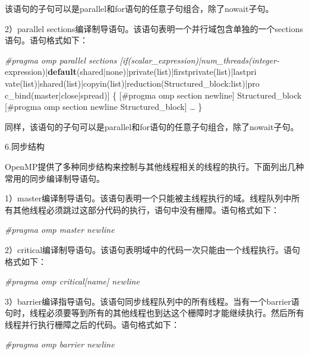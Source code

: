 \documentclass[]{ctexbook}
\newenvironment{Shaded}{\begin{snugshade}}{\end{snugshade}}
\newcommand{\ControlFlowTok}[1]{\textcolor[rgb]{0.13,0.29,0.53}{\textbf{#1}}}
\newcommand{\NormalTok}[1]{#1}
\newcommand{\PreprocessorTok}[1]{\textcolor[rgb]{0.56,0.35,0.01}{\textit{#1}}}
\begin{document}
该语句的子句可以是parallel和for语句的任意子句组合，除了nowait子句。

2）parallel sections编译制导语句。该语句表明一个并行域包含单独的一个sections语句。语句格式如下：

\begin{Shaded}
\begin{Highlighting}[]
\PreprocessorTok{\#pragma omp parallel sections [if(scalar\_expression)|num\_threads(integer{-}}
\NormalTok{expression)|}\ControlFlowTok{default}\NormalTok{(shared|none)|private(list)|firstprivate(list)|lastpri}
\NormalTok{vate(list)|shared(list)|copyin(list)|reduction(Structured\_block:list)|pro}
\NormalTok{c\_bind(master|close|spread)]}
\NormalTok{\{}
\NormalTok{    [\#progma omp section newline]}
\NormalTok{    Structured\_block}
\NormalTok{    [\#progma omp section newline}
\NormalTok{    Structured\_block]}
\NormalTok{    …}
\NormalTok{\}}
\end{Highlighting}
\end{Shaded}

同样，该语句的子句可以是parallel和for语句的任意子句组合，除了nowait子句。

6.同步结构

OpenMP提供了多种同步结构来控制与其他线程相关的线程的执行。下面列出几种常用的同步编译制导语句。

1）master编译制导语句。该语句表明一个只能被主线程执行的域。线程队列中所有其他线程必须跳过这部分代码的执行，语句中没有栅障。语句格式如下：

\begin{Shaded}
\begin{Highlighting}[]
\PreprocessorTok{\#pragma omp master newline}
\end{Highlighting}
\end{Shaded}

2）critical编译制导语句。该语句表明域中的代码一次只能由一个线程执行。语句格式如下：

\begin{Shaded}
\begin{Highlighting}[]
\PreprocessorTok{\#pragma omp critical[name] newline}
\end{Highlighting}
\end{Shaded}

3）barrier编译指导语句。该语句同步线程队列中的所有线程。当有一个barrier语句时，线程必须要等到所有的其他线程也到达这个栅障时才能继续执行。然后所有线程并行执行栅障之后的代码。语句格式如下：

\begin{Shaded}
\begin{Highlighting}[]
\PreprocessorTok{\#pragma omp barrier newline}
\end{Highlighting}
\end{Shaded}
\end{document}
